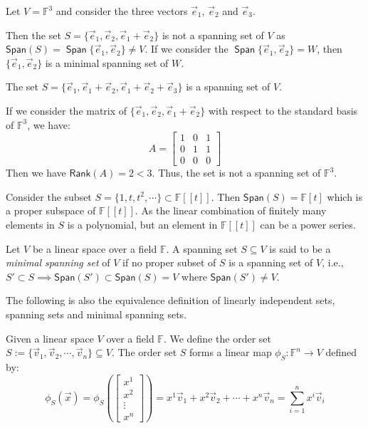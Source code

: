 \documentclass[
	11pt, %
	fleqn, %
	a4paper, %
]{LegrandOrangeBook}
\renewcommand{\span}[1]{\mathsf{Span}(#1)} %
\newcommand{\F}{\mathbb{F}} %
\newcommand{\rank}[1]{\mathsf{Rank}(#1)} %
\DeclareMathOperator{\Span}{\mathsf{Span}}
\begin{document}
\begin{example}
    Let $V = \F^3$ and consider the three vectors $\vec{e}_1$, $\vec{e}_2$ and $\vec{e}_3$. 
    
    Then the set $S = \{\vec{e}_1, \vec{e}_2, \vec{e}_1 + \vec{e}_2\}$ is not a spanning set of $V$ as $\span{S} = \Span \{\vec{e}_1, \vec{e}_2\} \neq V$. If we consider the $\Span \{\vec{e}_1, \vec{e}_2\} = W$, then $\{\vec{e}_1, \vec{e}_2\}$ is a minimal spanning set of $W$.

    The set $S = \{\vec{e}_1, \vec{e}_1 + \vec{e}_2, \vec{e}_1 + \vec{e}_2 + \vec{e}_3\}$ is a spanning set of $V$.
\end{example}
\begin{remark}
    If we consider the matrix of $\{\vec{e}_1, \vec{e}_2, \vec{e}_1 + \vec{e}_2\}$ with respect to the standard basis of $\F^3$, we have:
    \[
        A = \begin{bmatrix}
            1 & 0 & 1 \\
            0 & 1 & 1 \\
            0 & 0 & 0
        \end{bmatrix}
    \]
    Then we have $\rank{A} = 2 < 3$. Thus, the set is not a spanning set of $\F^3$.
\end{remark}

\begin{example}
    Consider the subset $S = \{ 1, t, t^2, \cdots \} \subset \F[[t]]$. Then $\span{S} = \F[t]$ which is a proper subspace of $\F[[t]]$. As the linear combination of finitely many elements in $S$ is a polynomial, but an element in $\F[[t]]$ can be a power series.
\end{example}

\begin{definition}
    Let $V$ be a linear space over a field $\F$. A spanning set $S \subseteq V$ is said to be a \emph{minimal spanning set} of $V$ if no proper subset of $S$ is a spanning set of $V$, i.e., $S' \subset S \implies \span{S'} \subset \span{S} = V$ where $\span{S'} \neq V$.
\end{definition}

The following is also the equivalence definition of linearly independent sets, spanning sets and minimal spanning sets.

Given a linear space $V$ over a field $\F$. We define the order set $S := \{\vec{v}_1, \vec{v}_2, \cdots, \vec{v}_n\} \subseteq V$. The order set $S$ forms a linear map $\phi_S: \F^n \to V$ defined by:
\[
    \phi_S(\vec{x}) = \phi_S\left(\begin{bmatrix}
        x^1 \\
        x^2 \\
        \vdots \\
        x^n
    \end{bmatrix}\right) = x^1 \vec{v}_1 + x^2 \vec{v}_2 + \cdots + x^n \vec{v}_n = \sum_{i=1}^{n} x^i \vec{v}_i
\]
\end{document}

